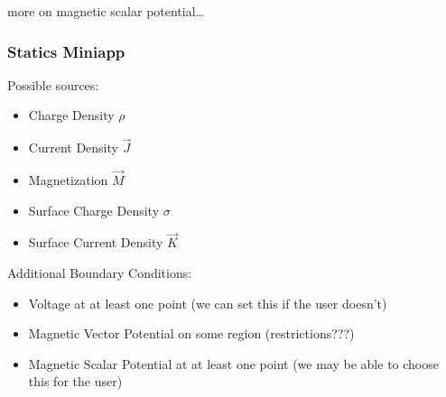 \documentclass{article}
\begin{document}
more on magnetic scalar potential\ldots

\subsubsection{Statics Miniapp}

Possible sources:
\begin{itemize}
\item Charge Density $\rho$
\item Current Density $\vec{J}$
\item Magnetization $\vec{M}$
\item Surface Charge Density $\sigma$
\item Surface Current Density $\vec{K}$
\end{itemize}

\noindent Additional Boundary Conditions:
\begin{itemize}
\item Voltage at at least one point (we can set this if the user doesn't)
\item Magnetic Vector Potential on some region (restrictions???)
\item Magnetic Scalar Potential at at least one point (we may be able
  to choose this for the user)
\end{itemize}
\end{document}
